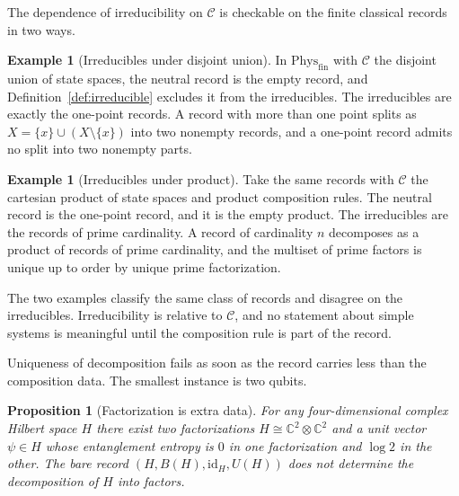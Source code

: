 \documentclass[11pt,letterpaper]{article}
\newtheorem{proposition}[theorem]{Proposition}
\theoremstyle{definition}
\newtheorem{example}[theorem]{Example}
\theoremstyle{remark}
\begin{document}
The dependence of irreducibility on $\mathcal{C}$ is checkable on the finite classical records in two ways.

\begin{example}[Irreducibles under disjoint union]
\label{ex:union-irreducibles}
In $\mathrm{Phys}_{\mathrm{fin}}$ with $\mathcal{C}$ the disjoint union of state spaces, the neutral record is the empty record, and Definition~\ref{def:irreducible} excludes it from the irreducibles. The irreducibles are exactly the one-point records. A record with more than one point splits as $X = \{x\} \cup (X \setminus \{x\})$ into two nonempty records, and a one-point record admits no split into two nonempty parts.
\end{example}

\begin{example}[Irreducibles under product]
\label{ex:product-irreducibles}
Take the same records with $\mathcal{C}$ the cartesian product of state spaces and product composition rules. The neutral record is the one-point record, and it is the empty product. The irreducibles are the records of prime cardinality. A record of cardinality $n$ decomposes as a product of records of prime cardinality, and the multiset of prime factors is unique up to order by unique prime factorization.
\end{example}

The two examples classify the same class of records and disagree on the irreducibles. Irreducibility is relative to $\mathcal{C}$, and no statement about simple systems is meaningful until the composition rule is part of the record.

Uniqueness of decomposition fails as soon as the record carries less than the composition data. The smallest instance is two qubits.

\begin{proposition}[Factorization is extra data]
\label{prop:factorization-nonunique}
For any four-dimensional complex Hilbert space $H$ there exist two factorizations $H \cong \mathbb{C}^2 \otimes \mathbb{C}^2$ and a unit vector $\psi \in H$ whose entanglement entropy is $0$ in one factorization and $\log 2$ in the other. The bare record $(H, B(H), \mathrm{id}_H, U(H))$ does not determine the decomposition of $H$ into factors.
\end{proposition}
\end{document}
